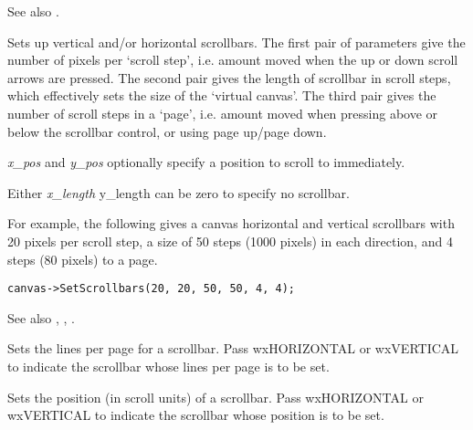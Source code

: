 See also .

\label{wxcanvassetscrollbars}


Sets up vertical and/or horizontal scrollbars. The first pair of
parameters give the number of pixels per `scroll step', i.e. amount
moved when the up or down scroll arrows are pressed.
The second pair gives the length of scrollbar
in scroll steps, which effectively sets the size of the `virtual
canvas'.  The third pair gives the number of scroll steps in a `page',
i.e. amount moved when pressing above or below the scrollbar control,
or using page up/page down.

{\it x\_pos} and {\it y\_pos} optionally specify a position to scroll to immediately.

Either {\it x\_length} {y\_length} can be zero to specify no scrollbar.

For example, the following gives a canvas horizontal and vertical
scrollbars with 20 pixels per scroll step, a size of 50 steps (1000
pixels) in each direction, and 4 steps (80 pixels) to a page.

\begin{verbatim}
canvas->SetScrollbars(20, 20, 50, 50, 4, 4);
\end{verbatim}

See also ,
\rtfsp{}, .

\label{wxcanvassetscrollpage}


Sets the lines per page for a scrollbar. Pass wxHORIZONTAL or wxVERTICAL
to indicate the scrollbar whose lines per page is to be set.

\label{wxcanvassetscrollpos}


Sets the position (in scroll units) of a scrollbar. Pass wxHORIZONTAL or wxVERTICAL
to indicate the scrollbar whose position is to be set.

